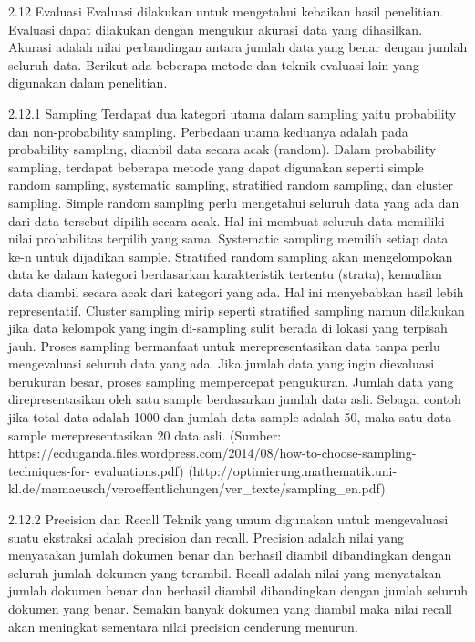 2.12 Evaluasi
Evaluasi dilakukan untuk mengetahui kebaikan hasil penelitian. Evaluasi dapat dilakukan dengan mengukur akurasi data yang dihasilkan. Akurasi adalah nilai perbandingan antara jumlah data yang benar dengan jumlah seluruh data. Berikut ada beberapa metode dan teknik evaluasi lain yang digunakan dalam penelitian.

2.12.1 Sampling
Terdapat dua kategori utama dalam sampling yaitu probability dan non-probability sampling. Perbedaan utama keduanya adalah pada probability sampling, diambil data secara acak (random). Dalam probability sampling, terdapat beberapa metode yang dapat digunakan seperti simple random sampling, systematic sampling, stratified random sampling, dan cluster sampling.
Simple random sampling perlu mengetahui seluruh data yang ada dan dari data tersebut dipilih secara acak. Hal ini membuat seluruh data memiliki nilai probabilitas terpilih yang sama. 
Systematic sampling memilih setiap data ke-n untuk dijadikan sample. 
Stratified random sampling akan mengelompokan data ke dalam kategori berdasarkan karakteristik tertentu (strata), kemudian data diambil secara acak dari kategori yang ada. Hal ini menyebabkan hasil lebih representatif. 
Cluster sampling mirip seperti stratified sampling namun dilakukan jika data kelompok yang ingin di-sampling sulit berada di lokasi yang terpisah jauh.
Proses sampling bermanfaat untuk merepresentasikan data tanpa perlu mengevaluasi seluruh data yang ada. Jika jumlah data yang ingin dievaluasi berukuran besar, proses sampling mempercepat pengukuran. Jumlah data yang direpresentasikan oleh satu sample berdasarkan jumlah data asli. Sebagai contoh jika total data adalah 1000 dan jumlah data sample adalah 50, maka satu data sample merepresentasikan 20 data asli.
(Sumber: https://ecduganda.files.wordpress.com/2014/08/how-to-choose-sampling-techniques-for-
evaluations.pdf)
(http://optimierung.mathematik.uni-kl.de/mamaeusch/veroeffentlichungen/ver_texte/sampling_en.pdf)

2.12.2 Precision dan Recall
Teknik yang umum digunakan untuk mengevaluasi suatu ekstraksi adalah precision dan recall. Precision adalah nilai yang menyatakan jumlah dokumen benar dan berhasil diambil dibandingkan dengan seluruh jumlah dokumen yang terambil. Recall adalah nilai yang menyatakan jumlah dokumen benar dan berhasil diambil dibandingkan dengan jumlah seluruh dokumen yang benar. Semakin banyak dokumen yang diambil maka nilai recall akan meningkat sementara nilai precision cenderung menurun. 

